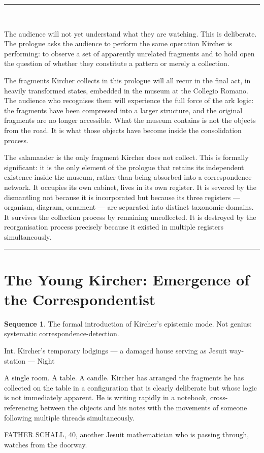 \documentclass[12pt, a4paper, twoside]{memoir}
\theoremstyle{definition}
\newtheorem{sequence}{Sequence}[chapter]
\theoremstyle{remark}
\newenvironment{sceneheading}{%
  \vspace{8pt}%
  \noindent\begin{mdframed}[
    linecolor=arkgold,
    linewidth=0.8pt,
    leftmargin=0pt,
    rightmargin=0pt,
    innerleftmargin=6pt,
    innerrightmargin=6pt,
    innertopmargin=4pt,
    innerbottommargin=4pt,
    backgroundcolor=arkgold!6
  ]%
  \noindent\textsc\bgroup\small
}{%
  \egroup\end{mdframed}\vspace{4pt}%
}
\newenvironment{action}{%
  \vspace{4pt}%
  \noindent\begin{minipage}{\linewidth}%
  \setlength{\parindent}{0pt}%
  \itshape\color{kircherink}%
}{%
  \end{minipage}\vspace{6pt}%
}
\newenvironment{interlude}{%
  \vspace{10pt}%
  \noindent\rule{\linewidth}{0.4pt}\\[2pt]%
  \noindent{\small\textsc{Theoretical Interlude}}\smallskip%
  \begin{mdframed}[
    linecolor=cosmosblue,
    linewidth=0.6pt,
    backgroundcolor=cosmosblue!4,
    innerleftmargin=10pt,
    innerrightmargin=10pt,
    innertopmargin=8pt,
    innerbottommargin=8pt,
    leftmargin=0pt,
    rightmargin=0pt,
  ]%
  \small
}{%
  \end{mdframed}%
  \vspace{6pt}%
  \noindent\rule{\linewidth}{0.4pt}\vspace{8pt}%
}
\begin{document}
\begin{interlude}
The audience will not yet understand what they are watching. This is deliberate. The prologue asks the audience to perform the same operation Kircher is performing: to observe a set of apparently unrelated fragments and to hold open the question of whether they constitute a pattern or merely a collection.

The fragments Kircher collects in this prologue will all recur in the final act, in heavily transformed states, embedded in the museum at the Collegio Romano. The audience who recognises them will experience the full force of the ark logic: the fragments have been compressed into a larger structure, and the original fragments are no longer accessible. What the museum contains is not the objects from the road. It is what those objects have become inside the consolidation process.

The salamander is the only fragment Kircher does not collect. This is formally significant: it is the only element of the prologue that retains its independent existence inside the museum, rather than being absorbed into a correspondence network. It occupies its own cabinet, lives in its own register. It is severed by the dismantling not because it is incorporated but because its three registers --- organism, diagram, ornament --- are separated into distinct taxonomic domains. It survives the collection process by remaining uncollected. It is destroyed by the reorganisation process precisely because it existed in multiple registers simultaneously.
\end{interlude}

\clearpage

\section{The Young Kircher: Emergence of the Correspondentist}

\begin{sequence}
\label{seq:young-kircher}
The formal introduction of Kircher's epistemic mode. Not genius: systematic correspondence-detection.
\end{sequence}

\begin{sceneheading}
Int. Kircher's temporary lodgings --- a damaged house serving as Jesuit way-station --- Night
\end{sceneheading}

\begin{action}
A single room. A table. A candle. Kircher has arranged the fragments he has collected on the table in a configuration that is clearly deliberate but whose logic is not immediately apparent. He is writing rapidly in a notebook, cross-referencing between the objects and his notes with the movements of someone following multiple threads simultaneously.

FATHER SCHALL, 40, another Jesuit mathematician who is passing through, watches from the doorway.
\end{action}
\end{document}
